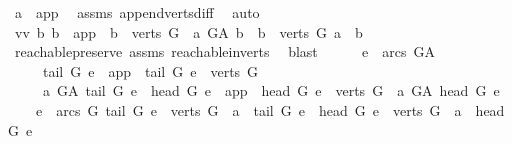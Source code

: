 \begin{isabellebody}
\ {\isachardoublequoteopen}a\ {\isasymnoteq}\ app{\isachardoublequoteclose}\ \isamarkupfalse%
\ assms{\isacharparenleft}{\kern0pt}{}{\isacharparenright}{\kern0pt}\ append{\isacharunderscore}{\kern0pt}verts{\isacharunderscore}{\kern0pt}diff\ \isamarkupfalse%
\ auto\isanewline
\ \ \isamarkupfalse%
\ \isamarkupfalse%
\ vv{\isacharcolon}{\kern0pt}\ {\isachardoublequoteopen}{\isacharbraceleft}{\kern0pt}b{\isachardot}{\kern0pt}\ {\isacharparenleft}{\kern0pt}b\ {\isacharequal}{\kern0pt}\ app\ {\isasymor}\ b\ {\isasymin}\ verts\ G{\isacharparenright}{\kern0pt}\ {\isasymand}\ a\ {\isasymrightarrow}\isactrlsup {\isacharplus}{\kern0pt}\isactrlbsub G{\isacharunderscore}{\kern0pt}A\isactrlesub \ b{\isacharbraceright}{\kern0pt}\ {\isacharequal}{\kern0pt}\ {\isacharbraceleft}{\kern0pt}b\ {\isasymin}\ verts\ G{\isachardot}{\kern0pt}\ a\ {\isasymrightarrow}\isactrlsup {\isacharplus}{\kern0pt}\ b{\isacharbraceright}{\kern0pt}{\isachardoublequoteclose}\ \isanewline
\ \ \ \ \isamarkupfalse%
\ reachable{}{\isacharunderscore}{\kern0pt}preserve\ assms\ reachable{}{\isacharunderscore}{\kern0pt}in{\isacharunderscore}{\kern0pt}verts{\isacharparenleft}{\kern0pt}{}{\isacharparenright}{\kern0pt}\ \isamarkupfalse%
\ blast\ \ \isanewline
\ \ \isamarkupfalse%
\ {\isachardoublequoteopen}{\isacharbraceleft}{\kern0pt}e\ {\isasymin}\ arcs\ G{\isacharunderscore}{\kern0pt}A{\isachardot}{\kern0pt}\isanewline
\ \ \ \ \ {\isacharparenleft}{\kern0pt}tail\ G\ e\ {\isacharequal}{\kern0pt}\ app\ {\isasymor}\ tail\ G\ e\ {\isasymin}\ verts\ G{\isacharparenright}{\kern0pt}\ {\isasymand}\isanewline
\ \ \ \ \ a\ {\isasymrightarrow}\isactrlsup {\isacharplus}{\kern0pt}\isactrlbsub G{\isacharunderscore}{\kern0pt}A\isactrlesub \ tail\ G\ e\ {\isasymand}\ {\isacharparenleft}{\kern0pt}head\ G\ e\ {\isacharequal}{\kern0pt}\ app\ {\isasymor}\ head\ G\ e\ {\isasymin}\ verts\ G{\isacharparenright}{\kern0pt}\ {\isasymand}\ a\ {\isasymrightarrow}\isactrlsup {\isacharplus}{\kern0pt}\isactrlbsub G{\isacharunderscore}{\kern0pt}A\isactrlesub \ head\ G\ e{\isacharbraceright}{\kern0pt}\ {\isacharequal}{\kern0pt}\isanewline
\ \ \ \ {\isacharbraceleft}{\kern0pt}e\ {\isasymin}\ arcs\ G{\isachardot}{\kern0pt}\ tail\ G\ e\ {\isasymin}\ verts\ G\ {\isasymand}\ a\ {\isasymrightarrow}\isactrlsup {\isacharplus}{\kern0pt}\ tail\ G\ e\ {\isasymand}\ head\ G\ e\ {\isasymin}\ verts\ G\ {\isasymand}\ a\ {\isasymrightarrow}\isactrlsup {\isacharplus}{\kern0pt}\ head\ G\ e{\isacharbraceright}{\kern0pt}\ {\isachardoublequoteclose}\isanewline

\end{isabellebody}

